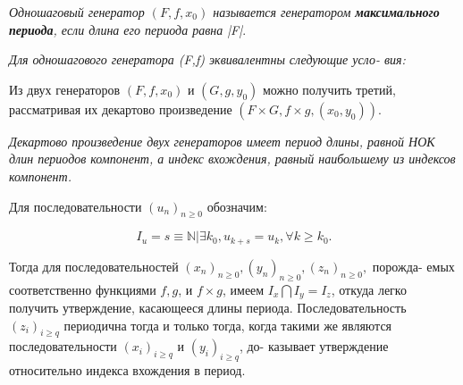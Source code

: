 \documentclass{../template/mai_book}
\begin{document}

\begin{determ} 
\textit{Одношаговый генератор $(F,f,x_{0})$ называется генератором \textbf{максимального периода}, если длина его периода равна |F|}.
\end{determ}
\begin{predl}
\slshape{Для одношагового генератора (F,f) эквивалентны следующие усло- \linebreak вия:} \par 
{}
\indent Из двух генераторов $(F,f,x_{0})$ и $(G,g,y_{0})$ можно получить третий, \linebreak рассматривая их декартово произведение $(F \times G, f \times g, (x_{0}, y_{0})).$
\end{predl}
\begin{predl}
 \slshape{Декартово произведение двух генераторов имеет период длины, \linebreak равной НОК длин периодов компонент, а индекс вхождения, равный \linebreak наибольшему из индексов компонент.}
\end{predl}
\begin{myproof}
 Для последовательности $(u_{n})_{n \geqslant 0}$ обозначим: \par 
 $$I_{u} = {s \equiv \mathbb{N}|\exists k_{0}, u_{k+s} = u_{k}, \forall k \geqslant k_{0}}.$$ \par 
 Тогда для последовательностей $(x_{n})_{n \geqslant 0}, (y_{n})_{n \geqslant 0}, (z_{n})_{n \geqslant 0},$ порожда- \linebreak \indent емых соответственно функциями $f, g$, и $f \times g$, имеем $I_{x} \bigcap I_{y} = I_{z}$, \linebreak \indent откуда легко получить утверждение, касающееся длины периода. \linebreak \indent Последовательность $(z_{i})_{i \geqslant q}$ периодична тогда и только тогда, когда \linebreak \indent такими же являются последовательности $(x_{i})_{i \geqslant q}$ и $(y_{i})_{i \geqslant q}$, до- \linebreak \indent казывает утверждение относительно индекса вхождения в период. \par 
\end{myproof}
\end{document}
